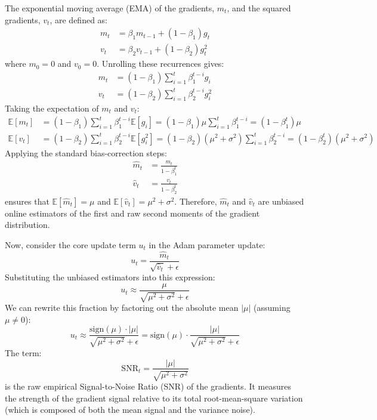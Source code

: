 \documentclass{article}
\theoremstyle{plain}
\theoremstyle{definition}
\theoremstyle{remark}
\begin{document}
The exponential moving average (EMA) of the gradients, $m_t$, and the squared gradients, $v_t$, are defined as:
\begin{align}
    m_t &= \beta_1 m_{t-1} + (1 - \beta_1) g_t \\
    v_t &= \beta_2 v_{t-1} + (1 - \beta_2) g_t^2
\end{align}
where $m_0 = 0$ and $v_0 = 0$. Unrolling these recurrences gives:
\begin{align}
    m_t &= (1 - \beta_1) \sum_{i=1}^t \beta_1^{t-i} g_i \\
    v_t &= (1 - \beta_2) \sum_{i=1}^t \beta_2^{t-i} g_i^2
\end{align}
Taking the expectation of $m_t$ and $v_t$:
\begin{align}
    \mathbb{E}[m_t] &= (1 - \beta_1) \sum_{i=1}^t \beta_1^{t-i} \mathbb{E}[g_i] = (1 - \beta_1) \mu \sum_{i=1}^t \beta_1^{t-i} = (1 - \beta_1^t) \mu \\
    \mathbb{E}[v_t] &= (1 - \beta_2) \sum_{i=1}^t \beta_2^{t-i} \mathbb{E}[g_i^2] = (1 - \beta_2) (\mu^2 + \sigma^2) \sum_{i=1}^t \beta_2^{t-i} = (1 - \beta_2^t) (\mu^2 + \sigma^2)
\end{align}
Applying the standard bias-correction steps:
\begin{align}
    \hat{m}_t &= \frac{m_t}{1 - \beta_1^t} \\
    \hat{v}_t &= \frac{v_t}{1 - \beta_2^t}
\end{align}
ensures that $\mathbb{E}[\hat{m}_t] = \mu$ and $\mathbb{E}[\hat{v}_t] = \mu^2 + \sigma^2$. Therefore, $\hat{m}_t$ and $\hat{v}_t$ are unbiased online estimators of the first and raw second moments of the gradient distribution.

Now, consider the core update term $u_t$ in the Adam parameter update:
\begin{equation}
    u_t = \frac{\hat{m}_t}{\sqrt{\hat{v}_t} + \epsilon}
\end{equation}
Substituting the unbiased estimators into this expression:
\begin{equation}
    u_t \approx \frac{\mu}{\sqrt{\mu^2 + \sigma^2} + \epsilon}
\end{equation}
We can rewrite this fraction by factoring out the absolute mean $|\mu|$ (assuming $\mu \neq 0$):
\begin{equation}
    u_t \approx \frac{\text{sign}(\mu) \cdot |\mu|}{\sqrt{\mu^2 + \sigma^2} + \epsilon} = \text{sign}(\mu) \cdot \frac{|\mu|}{\sqrt{\mu^2 + \sigma^2} + \epsilon}
\end{equation}
The term:
\begin{equation}
    \text{SNR}_t = \frac{|\mu|}{\sqrt{\mu^2 + \sigma^2}}
\end{equation}
is the raw empirical Signal-to-Noise Ratio (SNR) of the gradients. It measures the strength of the gradient signal relative to its total root-mean-square variation (which is composed of both the mean signal and the variance noise).
\end{document}
